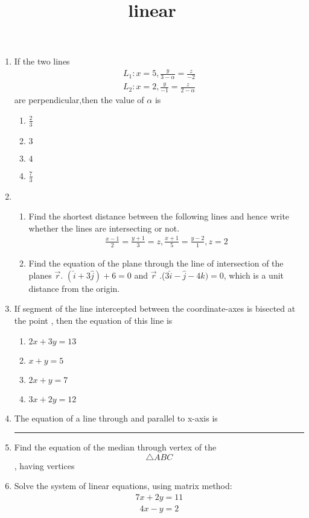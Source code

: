 \documentclass{article}
\title{linear}
\begin{document}
\begin{enumerate}
	\item If the two lines
	\begin{align}	
		L_{1} : x=5, \frac{y}{3-\alpha} = \frac{z}{-2}
	\end{align}
	\begin{align}
		L_{2}: x=2, \frac{y}{-1} = \frac{z}{2-\alpha}
	\end{align}
   	 are perpendicular,then the value of $\alpha$ is
   	\begin{enumerate}%
   		\item $\frac{2}{3}$
		\item $3$
		\item $4$
		\item $\frac{7}{3}$
	\end{enumerate}
	\item \begin{enumerate} %
	\item Find the shortest distance between the following lines and hence write whether the lines are intersecting or not.
	\begin{align}
		\frac{x-1}{2} = \frac{y+1}{3}=z,
		\frac{x+1}{5} = \frac{y-2}{1}, 
		z=2
	\end{align}
	\item Find the equation of the plane through the line of intersection of the planes $\vec{r}$. $(\hat{i}+3\hat{j}) + 6 = 0$ and $\vec{r}$ .($3\hat{i}-\hat{j}-4\hat{k}) = 0$, which is a unit distance from the origin.
	\end{enumerate}
\item If segment of the line intercepted between the coordinate-axes is bisected at the point , then the equation of this line is
		\begin{enumerate}%
			\item $2x + 3y = 13$
			\item $x+y = 5$
			\item $2x + y = 7$
			\item $3x + 2y = 12$
		\end{enumerate}
	\item The equation of a line through  and parallel to x-axis is\rule{1cm}{0.15mm}
	\item Find the equation of the median through vertex  of the $$\triangle{ABC}$$, having vertices 
	\item Solve the system of linear equations, using matrix method:
		\begin{align}	
			7x+2y = 11
		\end{align}
		\begin{align}
			4x-y = 2
		\end{align}
\end{enumerate}
\end{document}
